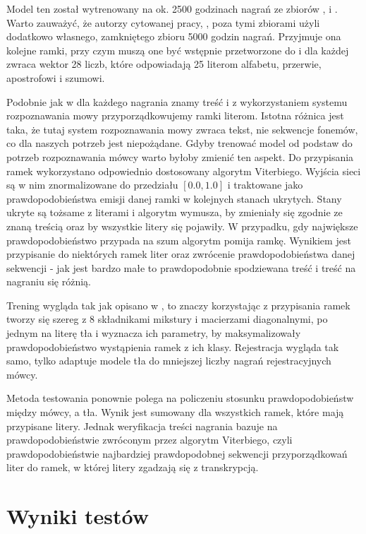Model ten został wytrenowany na ok. 2500 godzinach nagrań ze zbiorów , 
i . Warto zauważyć, że autorzy cytowanej pracy, , poza tymi zbiorami użyli
dodatkowo własnego, zamkniętego zbioru 5000 godzin nagrań. Przyjmuje ona kolejne ramki, przy czym muszą
one być wstępnie przetworzone do  i dla każdej zwraca wektor 28 liczb, które odpowiadają
25 literom alfabetu, przerwie, apostrofowi i szumowi.

Podobnie jak w  dla każdego nagrania znamy treść i z wykorzystaniem systemu rozpoznawania
mowy przyporządkowujemy ramki literom. Istotna różnica jest taka, że tutaj system rozpoznawania mowy zwraca
tekst, nie sekwencje fonemów, co dla naszych potrzeb jest niepożądane. Gdyby trenować model od podstaw do
potrzeb rozpoznawania mówcy warto byłoby zmienić ten aspekt. Do przypisania ramek wykorzystano odpowiednio
dostosowany algorytm Viterbiego. Wyjścia sieci są w nim znormalizowane do przedziału $[0.0, 1.0]$ i traktowane
jako prawdopodobieństwa emisji danej ramki w kolejnych stanach ukrytych. Stany ukryte są tożsame z literami
i algorytm wymusza, by zmieniały się zgodnie ze znaną treścią oraz by wszystkie litery się pojawiły.
W przypadku, gdy największe prawdopodobieństwo przypada na szum algorytm pomija ramkę. Wynikiem
jest przypisanie do niektórych ramek liter oraz zwrócenie prawdopodobieństwa danej sekwencji - jak jest
bardzo małe to prawdopodobnie spodziewana treść i treść na nagraniu się różnią.

Trening wygląda tak jak opisano w , to znaczy korzystając z przypisania ramek
tworzy się szereg  z $8$ składnikami mikstury i macierzami diagonalnymi,
po jednym na literę tła i wyznacza ich parametry, by maksymalizowały prawdopodobieństwo wystąpienia
ramek z ich klasy. Rejestracja wygląda tak samo, tylko  adaptuje modele tła do
mniejszej liczby nagrań rejestracyjnych mówcy.

Metoda testowania ponownie polega na policzeniu stosunku prawdopodobieństw między  mówcy, a tła.
Wynik jest sumowany dla wszystkich ramek, które mają przypisane litery. Jednak weryfikacja treści nagrania
bazuje na prawdopodobieństwie zwróconym przez algorytm Viterbiego, czyli prawdopodobieństwie najbardziej
prawdopodobnej sekwencji przyporządkowań liter do ramek, w której litery zgadzają się z transkrypcją.

\section{Wyniki testów}
\label{sec:test_results}

